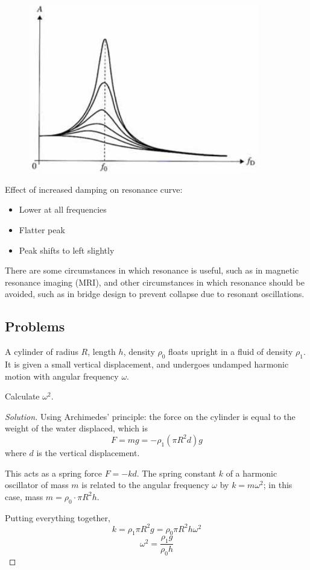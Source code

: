 \begin{figure}[H]
    \centering
    \includegraphics[width=10cm]{images/Amptlitude_forced_oscillation.png}
\end{figure}

Effect of increased damping on resonance curve:
\begin{itemize}
\item Lower at all frequencies
\item Flatter peak
\item Peak shifts to left slightly
\end{itemize}

There are some circumstances in which resonance is useful, such as in magnetic resonance imaging (MRI), and other circumstances in which resonance should be avoided, such as in bridge design to prevent collapse due to resonant oscillations.
\pagebreak

\subsection*{Problems}
\begin{prbm}
A cylinder of radius $R$, length $h$, density $\rho_0$ floats upright in a fluid of density $\rho_1$. It is given a small vertical displacement, and undergoes undamped harmonic motion with angular frequency $\omega$. 

Calculate $\omega^2$.
\end{prbm}

\begin{proof}[Solution]
Using Archimedes’ principle: the force on the cylinder is equal to the weight of the water displaced, which is
\[ F = mg = -\rho_1 (\pi R^2 d)g \]
where $d$ is the vertical displacement. 

This acts as a spring force $F=-kd$. The spring constant $k$ of a harmonic oscillator of mass $m$ is related to the angular frequency $\omega$ by $k=m\omega^2$; in this case, mass $m=\rho_0 \cdot \pi R^2h$.

Putting everything together, 
\[ k=\rho_1\pi R^2 g = \rho_0\pi R^2 h\omega^2 \]
\[ \boxed{\omega^2=\frac{\rho_1g}{\rho_0h}} \]
\end{proof}
\pagebreak

